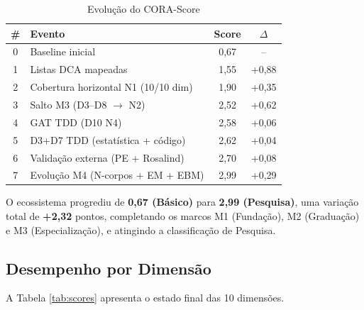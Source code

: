 \documentclass[12pt,a4paper]{article}
\begin{document}
\begin{table}[H]
\centering
\caption{Evolução do CORA-Score}
\label{tab:evolution}
\begin{tabular}{clcc}
\toprule
\textbf{\#} & \textbf{Evento} & \textbf{Score} & $\Delta$ \\
\midrule
0 & Baseline inicial                       & 0,67  & --     \\
1 & Listas DCA mapeadas                    & 1,55  & +0,88  \\
2 & Cobertura horizontal N1 (10/10 dim)    & 1,90  & +0,35  \\
3 & Salto M3 (D3--D8 $\rightarrow$ N2)     & 2,52  & +0,62  \\
4 & GAT TDD (D10 N4)                      & 2,58  & +0,06  \\
5 & D3+D7 TDD (estatística + código)      & 2,62  & +0,04  \\
6 & Validação externa (PE + Rosalind)     & 2,70  & +0,08  \\
7 & Evolução M4 (N-corpos + EM + EBM)     & 2,99  & +0,29  \\
\bottomrule
\end{tabular}
\end{table}

O ecossistema progrediu de \textbf{0,67 (Básico)} para \textbf{2,99 (Pesquisa)},
uma variação total de \textbf{+2,32} pontos, completando os marcos M1 (Fundação),
M2 (Graduação) e M3 (Especialização), e atingindo a classificação de Pesquisa.

\subsection{Desempenho por Dimensão}

A Tabela \ref{tab:scores} apresenta o estado final das 10 dimensões.
\end{document}

